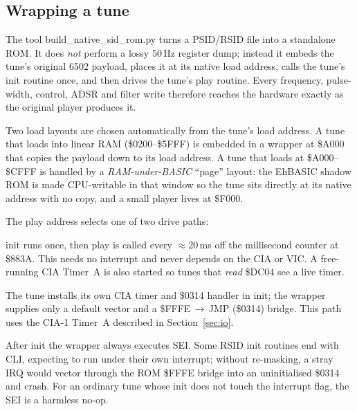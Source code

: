 \documentclass[11pt,a4paper]{article}
\newcommand{\reg}[1]{{\ttfamily #1}}
\begin{document}
\subsection{Wrapping a tune}

The tool \reg{build\_native\_sid\_rom.py} turns a PSID/RSID file into a
standalone ROM. It does \emph{not} perform a lossy 50\,Hz register dump;
instead it embeds the tune's original 6502 payload, places it at its
native load address, calls the tune's \reg{init} routine once, and then
drives the tune's \reg{play} routine. Every frequency, pulse-width,
control, ADSR and filter write therefore reaches the hardware exactly as
the original player produces it.

Two load layouts are chosen automatically from the tune's load address.
A tune that loads into linear RAM (\reg{\$0200--\$5FFF}) is embedded in a
wrapper at \reg{\$A000} that copies the payload down to its load address.
A tune that loads at \reg{\$A000--\$CFFF} is handled by a
\emph{RAM-under-BASIC} ``page'' layout: the EhBASIC shadow ROM is made
CPU-writable in that window so the tune sits directly at its native
address with no copy, and a small player lives at \reg{\$F000}.

The \reg{play} address selects one of two drive paths:

\begin{description}[leftmargin=1.2em,style=nextline,itemsep=0.25em]
  \item[\color{accent2}Polled (\reg{play}\,$\neq$\,0).]
  \reg{init} runs once, then \reg{play} is called every $\approx$20\,ms
  off the millisecond counter at \reg{\$883A}. This needs no interrupt
  and never depends on the CIA or VIC. A free-running CIA Timer~A is also
  started so tunes that \emph{read} \reg{\$DC04} see a live timer.
  \item[\color{accent2}Interrupt-driven (\reg{play}\,=\,0).]
  The tune installs its own CIA timer and \reg{\$0314} handler in
  \reg{init}; the wrapper supplies only a default vector and a
  \reg{\$FFFE\,$\to$\,JMP (\$0314)} bridge. This path uses the CIA-1
  Timer~A described in Section~\ref{sec:io}.
\end{description}

After \reg{init} the wrapper always executes \reg{SEI}. Some RSID
\reg{init} routines end with \reg{CLI}, expecting to run under their own
interrupt; without re-masking, a stray IRQ would vector through the ROM
\reg{\$FFFE} bridge into an uninitialised \reg{\$0314} and crash. For an
ordinary tune whose \reg{init} does not touch the interrupt flag, the
\reg{SEI} is a harmless no-op.
\end{document}
